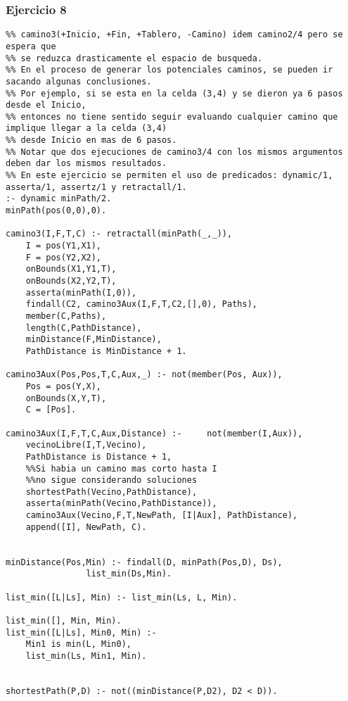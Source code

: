 \subsubsection*{Ejercicio 8}
\begin{lstlisting}
%% camino3(+Inicio, +Fin, +Tablero, -Camino) idem camino2/4 pero se espera que
%% se reduzca drasticamente el espacio de busqueda.
%% En el proceso de generar los potenciales caminos, se pueden ir sacando algunas conclusiones.
%% Por ejemplo, si se esta en la celda (3,4) y se dieron ya 6 pasos desde el Inicio,
%% entonces no tiene sentido seguir evaluando cualquier camino que implique llegar a la celda (3,4)
%% desde Inicio en mas de 6 pasos.
%% Notar que dos ejecuciones de camino3/4 con los mismos argumentos deben dar los mismos resultados.
%% En este ejercicio se permiten el uso de predicados: dynamic/1, asserta/1, assertz/1 y retractall/1.
:- dynamic minPath/2.
minPath(pos(0,0),0).

camino3(I,F,T,C) :- retractall(minPath(_,_)),
	I = pos(Y1,X1),
	F = pos(Y2,X2),
	onBounds(X1,Y1,T),
	onBounds(X2,Y2,T),
	asserta(minPath(I,0)),
	findall(C2, camino3Aux(I,F,T,C2,[],0), Paths),
	member(C,Paths),
	length(C,PathDistance),
	minDistance(F,MinDistance),
	PathDistance is MinDistance + 1.

camino3Aux(Pos,Pos,T,C,Aux,_) :- not(member(Pos, Aux)),
	Pos = pos(Y,X),
	onBounds(X,Y,T),
	C = [Pos].

camino3Aux(I,F,T,C,Aux,Distance) :- 	not(member(I,Aux)),
	vecinoLibre(I,T,Vecino),
	PathDistance is Distance + 1,
	%%Si habia un camino mas corto hasta I
	%%no sigue considerando soluciones
	shortestPath(Vecino,PathDistance),
	asserta(minPath(Vecino,PathDistance)),
	camino3Aux(Vecino,F,T,NewPath, [I|Aux], PathDistance),
	append([I], NewPath, C).
		
		
minDistance(Pos,Min) :- findall(D, minPath(Pos,D), Ds),
				list_min(Ds,Min).

list_min([L|Ls], Min) :- list_min(Ls, L, Min).

list_min([], Min, Min).
list_min([L|Ls], Min0, Min) :-
    Min1 is min(L, Min0),
    list_min(Ls, Min1, Min).


shortestPath(P,D) :- not((minDistance(P,D2), D2 < D)).
\end{lstlisting}
\vspace{1cm}